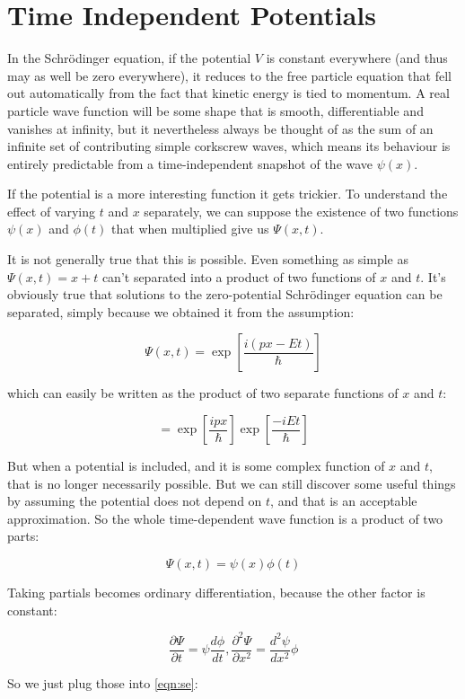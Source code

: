 \section{Time Independent Potentials}

In the Schrödinger equation, if the potential $V$ is constant everywhere (and thus may as well be zero everywhere), it reduces to the free particle equation that fell out automatically from the fact that kinetic energy is tied to momentum. A real particle wave function will be some shape that is smooth, differentiable and vanishes at infinity, but it nevertheless always be thought of as the sum of an infinite set of contributing simple corkscrew waves, which means its behaviour is entirely predictable from a time-independent snapshot of the wave $\psi(x)$.

If the potential is a more interesting function it gets trickier. To understand the effect of varying $t$ and $x$ separately, we can suppose the existence of two functions $\psi(x)$ and $\phi(t)$ that when multiplied give us $\Psi(x, t)$.

It is not generally true that this is possible. Even something as simple as $\Psi(x, t) = x + t$ can't separated into a product of two functions of $x$ and $t$. It's obviously true that solutions to the zero-potential Schrödinger equation can be separated, simply because we obtained it from the assumption:

$$
\Psi(x, t) = \exp \left[ {\frac{i(px - Et)}{\hbar}} \right]
$$

which can easily be written as the product of two separate functions of $x$ and $t$:

$$
= \exp \left[ {\frac{ipx}{\hbar}} \right]
\exp \left[ {\frac{-iEt}{\hbar}} \right]
$$

But when a potential is included, and it is some complex function of $x$ and $t$, that is no longer necessarily possible. But we can still discover some useful things by assuming the potential does not depend on $t$, and that is an acceptable approximation. So the whole time-dependent wave function is a product of two parts:

$$\Psi(x, t) = \psi(x) \phi(t)$$

Taking partials becomes ordinary differentiation, because the other factor is constant:

$$
\frac{\partial \Psi}{\partial t}
= \psi \frac{d \phi}{d t},
\frac{\partial^2 \Psi}{\partial x^2}
= \frac{d^2 \psi}{d x^2}  \phi
$$

So we just plug those into \eqref{eqn:se}:


